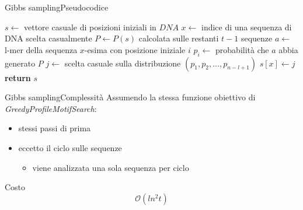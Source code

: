 	\begin{frame}{Gibbs sampling}{Pseudocodice}
		\begin{center}
			\begin{minipage}{11.5cm}
			    \begin{algorithmic}[1]
				    	\State $s\gets$  vettore casuale di posizioni iniziali in $DNA$
				    	\Repeat
				    		\State $x\gets$ indice di una sequenza di DNA scelta casualmente
				    		\State $P\gets P(s)$ calcolata sulle restanti $t-1$ sequenze
				    			\State $a\gets$ l-mer della sequenza $x$-esima con posizione iniziale $i$
				    			\State $p_i\gets $ probabilità che $a$ abbia generato $P$
				    		\EndFor
				    		\State $j\gets$ scelta casuale sulla distribuzione $(p_1,p_2,\dots,p_{n-l+1})$
				    		\State $s[x]\gets j$
				    	\State \textbf{return} $s$
				    \EndProcedure
			    \end{algorithmic}
			\end{minipage}
	    \end{center}
	\end{frame}
	
	\begin{frame}{Gibbs sampling}{Complessità}
		Assumendo la stessa funzione obiettivo di \textit{GreedyProfileMotifSearch}:
		\begin{itemize}
			\item stessi passi di prima
			\item eccetto il ciclo sulle sequenze
			\begin{itemize}
				\item viene analizzata una sola sequenza per ciclo
			\end{itemize}
		\end{itemize}
		\pause
		\begin{center}
			\begin{minipage}{3cm}
				\begin{varblock}{Costo}
					$$\mathcal{O}(ln^2t)$$
				\end{varblock}
			\end{minipage}
		\end{center}
	\end{frame}
	
